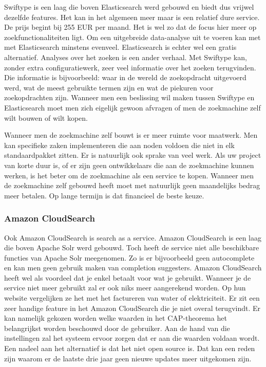 Swiftype is een laag die boven Elasticsearch werd gebouwd en biedt dus vrijwel dezelfde features. Het kan in het algemeen meer maar is een relatief dure service. De prijs begint bij 255 EUR per maand. Het is wel zo dat de focus hier meer op zoekfunctionaliteiten ligt. Om een uitgebreide data-analyse uit te voeren kan met met Elasticsearch minstens evenveel. Elasticsearch is echter wel een gratis alternatief. Analyses over het zoeken is een ander verhaal. Met Swiftype kan, zonder extra configuratiewerk, zeer veel informatie over het zoeken terugvinden. Die informatie is bijvoorbeeld: waar in de wereld de zoekopdracht uitgevoerd werd, wat de meest gebruikte termen zijn en wat de piekuren voor zoekopdrachten zijn. Wanneer men een beslissing wil maken tussen Swiftype en Elasticsearch  moet men zich eigelijk gewoon afvragen of men de zoekmachine zelf wilt bouwen of wilt kopen.

Wanneer men de zoekmachine zelf bouwt is er meer ruimte voor maatwerk. Men kan specifieke zaken implementeren die aan noden voldoen die niet in elk standaardpakket zitten. Er is natuurlijk ook sprake van veel werk. Als uw project van korte duur is, of er zijn geen ontwikkelaars die aan de zoekmachine kunnen werken, is het beter om de zoekmachine als een service te kopen. Wanneer men de zoekmachine zelf gebouwd heeft moet met natuurlijk geen maandelijks bedrag meer betalen. Op lange termijn is dat financieel de beste keuze.

\subsubsection{Amazon CloudSearch}

Ook Amazon CloudSearch is search as a service. Amazon CloudSearch is een laag die boven Apache Solr werd gebouwd. Toch heeft de service niet alle beschikbare functies van Apache Solr meegenomen. Zo is er bijvoorbeeld geen autocomplete en kan men geen gebruik maken van completion suggesters. Amazon CloudSearch heeft wel als voordeel dat je enkel betaalt voor wat je gebruikt. Wanneer je de service niet meer gebruikt zal er ook niks meer aangerekend worden. Op hun website vergelijken ze het met het factureren van water of elektriciteit. Er zit een zeer handige feature in het Amazon CloudSearch die je niet overal terugvindt. Er kan namelijk gekozen worden welke waarden in het CAP-theorema het belangrijkst worden beschouwd door de gebruiker. Aan de hand van die instellingen zal het systeem ervoor zorgen dat er aan die waarden voldaan wordt. Een nadeel aan het alternatief is dat het niet open source is. Dat kan een reden zijn waarom er de laatste drie jaar geen nieuwe updates meer uitgekomen zijn.

